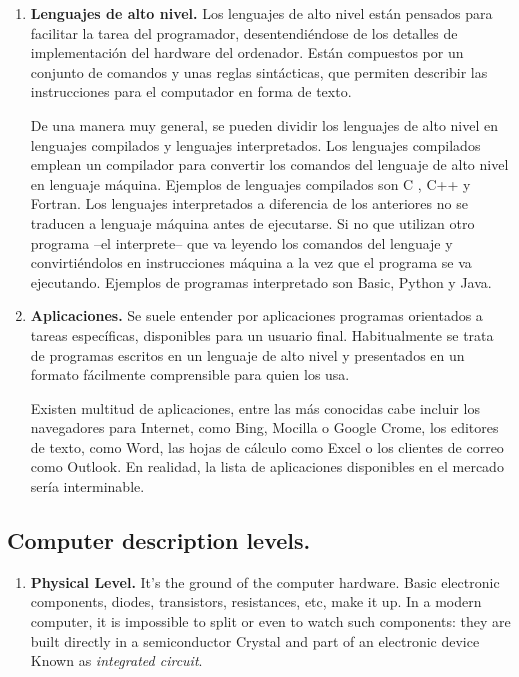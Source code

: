 \begin{paracol}{2}
\begin{enumerate}
\item \textbf{Lenguajes de alto nivel.} 
Los lenguajes de alto nivel están pensados para facilitar la tarea del programador, desentendiéndose de los detalles de implementación del hardware del ordenador.  Están compuestos por un conjunto de comandos y unas reglas sintácticas, que permiten describir las instrucciones para el computador en forma de texto.

De una manera muy general, se pueden dividir los lenguajes de alto nivel en lenguajes compilados y lenguajes interpretados. Los lenguajes compilados emplean un compilador para convertir los comandos del lenguaje de alto nivel en lenguaje máquina. Ejemplos de lenguajes compilados son C , C++ y Fortran. Los lenguajes interpretados a diferencia de los anteriores no se traducen a lenguaje máquina antes de ejecutarse. Si no que utilizan otro programa --el interprete-- que va leyendo los comandos del lenguaje y convirtiéndolos en instrucciones máquina a la vez que el programa se va ejecutando. Ejemplos de programas interpretado son Basic, Python y Java.

\item \textbf{Aplicaciones.}  Se suele entender por aplicaciones programas orientados a tareas específicas, disponibles para un usuario final. Habitualmente se trata de programas escritos en un lenguaje de alto nivel y presentados en un formato fácilmente comprensible para quien los usa.

Existen multitud de aplicaciones, entre las más conocidas cabe incluir los navegadores para Internet, como Bing, Mocilla o Google Crome, los editores de texto, como Word, las hojas de cálculo como Excel o los clientes de correo como Outlook. En realidad, la lista de aplicaciones disponibles en el mercado sería interminable. 
\end{enumerate}

\switchcolumn
\subsection{Computer description levels.}
\begin{enumerate}
\item \textbf{Physical Level.} It's the ground of the computer hardware. Basic electronic components, diodes, transistors, resistances, etc, make it up. In a modern computer, it is impossible to split or even to watch such components: they are built directly in a semiconductor Crystal and part\; of an electronic device Known as \emph{integrated circuit}.


\end{enumerate}
\end{paracol}

